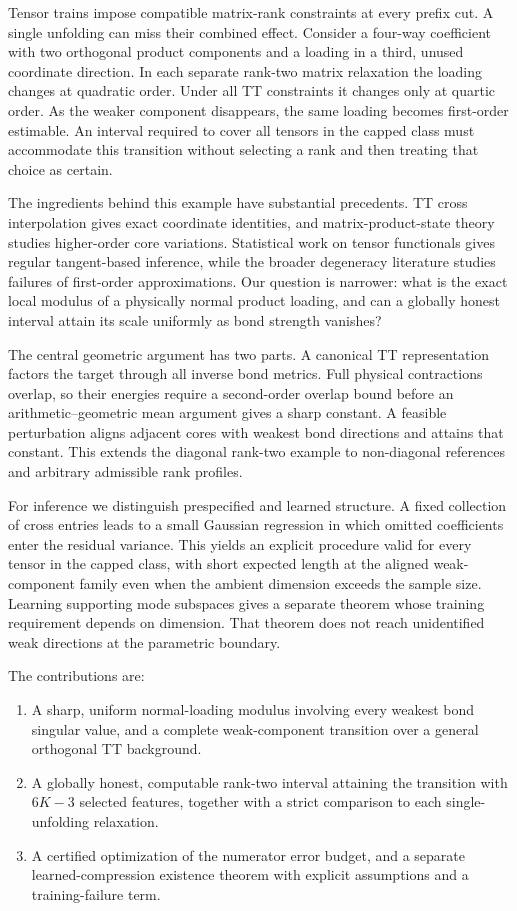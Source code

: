 \documentclass[
  11pt,
]{article}
\providecommand{\tightlist}{%
  \setlength{\itemsep}{0pt}\setlength{\parskip}{0pt}}
\begin{document}
Tensor trains impose compatible matrix-rank constraints at every prefix
cut. A single unfolding can miss their combined effect. Consider a
four-way coefficient with two orthogonal product components and a
loading in a third, unused coordinate direction. In each separate
rank-two matrix relaxation the loading changes at quadratic order. Under
all TT constraints it changes only at quartic order. As the weaker
component disappears, the same loading becomes first-order estimable. An
interval required to cover all tensors in the capped class must
accommodate this transition without selecting a rank and then treating
that choice as certain.

The ingredients behind this example have substantial precedents. TT
cross interpolation gives exact coordinate identities, and
matrix-product-state theory studies higher-order core variations.
Statistical work on tensor functionals gives regular tangent-based
inference, while the broader degeneracy literature studies failures of
first-order approximations. Our question is narrower: what is the exact
local modulus of a physically normal product loading, and can a globally
honest interval attain its scale uniformly as bond strength vanishes?

The central geometric argument has two parts. A canonical TT
representation factors the target through all inverse bond metrics. Full
physical contractions overlap, so their energies require a second-order
overlap bound before an arithmetic--geometric mean argument gives a
sharp constant. A feasible perturbation aligns adjacent cores with
weakest bond directions and attains that constant. This extends the
diagonal rank-two example to non-diagonal references and arbitrary
admissible rank profiles.

For inference we distinguish prespecified and learned structure. A fixed
collection of cross entries leads to a small Gaussian regression in
which omitted coefficients enter the residual variance. This yields an
explicit procedure valid for every tensor in the capped class, with
short expected length at the aligned weak-component family even when the
ambient dimension exceeds the sample size. Learning supporting mode
subspaces gives a separate theorem whose training requirement depends on
dimension. That theorem does not reach unidentified weak directions at
the parametric boundary.

The contributions are:

\begin{enumerate}
\def\labelenumi{\arabic{enumi}.}
\tightlist
\item
  A sharp, uniform normal-loading modulus involving every weakest bond
  singular value, and a complete weak-component transition over a
  general orthogonal TT background.
\item
  A globally honest, computable rank-two interval attaining the
  transition with \(6K-3\) selected features, together with a strict
  comparison to each single-unfolding relaxation.
\item
  A certified optimization of the numerator error budget, and a separate
  learned-compression existence theorem with explicit assumptions and a
  training-failure term.
\end{enumerate}
\end{document}
